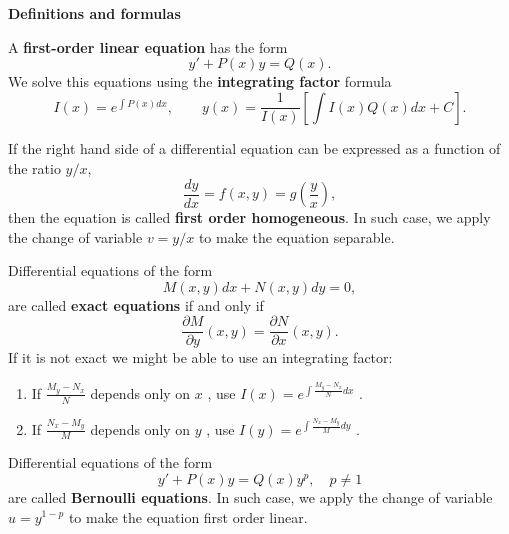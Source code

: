 \documentclass[11pt]{article}
\begin{document}
\begin{preamble}
\textbf{Definitions and formulas}

\begin{formulaitem}
\item A \textbf{first-order linear equation} has the form
\[y' +P(x)y=Q(x).\]
We solve this equations using the \textbf{integrating factor} formula
\[I(x)=e^{\int P(x) dx},\qquad y(x)=\frac{1}{I(x)}\left[\int I(x)Q(x)dx +C \right].\]

\item If the right hand side of a differential equation can be expressed as a function of the ratio $y/x$, \[\frac{dy}{dx}=f(x,y)=g\left(\frac{y}{x}\right),\] then the equation is called \textbf{first order homogeneous}. In such case, we apply the change of variable $v=y/x$ to make the equation separable.

\item Differential equations of the form
\[M(x,y)dx + N(x,y) dy = 0,\]
are called \textbf{exact equations} if and only if
\[\frac{\partial M}{\partial y}(x,y)=\frac{\partial N}{\partial x}(x,y).\]
If it is not exact we might be able to use an integrating factor:
\begin{enumerate}
 \item If $\frac{M_{ y} - N_{ x}}{ N}$ depends only on $x$ , use $I ( x ) = e^{\int \frac{M_{ y} - N_{ x}}{ N} dx}$ .
 \item If $\frac{N_{ x} - M_{ y}}{ M}$ depends only on $y$ , use $I ( y ) = e^{\int \frac{N_{ x} - M_{ y}}{ M} dy}$ .
\end{enumerate}


\item Differential equations of the form
\[y'+P(x)y=Q(x)y^{p},\quad p\neq 1\]
are called \textbf{Bernoulli equations}. In such case, we apply the change of variable $u=y^{1-p}$ to make the equation first order linear.
\end{formulaitem}
\end{preamble}
\end{document}
